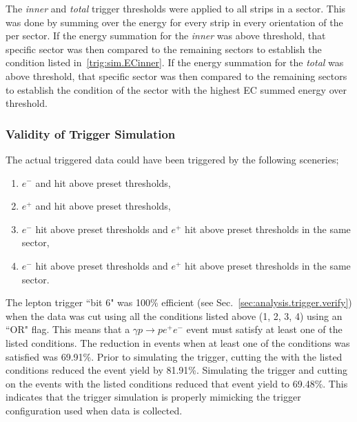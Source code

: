 The  \emph{inner} and  \emph{total} trigger thresholds were applied to all  strips in a sector. This was done by summing over the energy for every strip in every orientation of the  per sector. If the energy summation for the  \emph{inner} was above threshold,   that specific sector was then compared to the remaining sectors to establish the condition listed in~\ref{trig:sim.ECinner}. If the energy summation for the  \emph{total} was above threshold, that specific sector was then compared to the remaining sectors to establish the condition of the sector with the highest EC summed energy over threshold.
\subsubsection{Validity of Trigger Simulation}
The actual triggered data could have been triggered by the following sceneries;
\begin{enumerate}\label{trig:get.all}
	\item $e^-$  and  hit above preset thresholds,
	\item $e^+$  and  hit above preset thresholds,
	\item $e^-$  hit above preset thresholds and $e^+$  hit above preset thresholds in the same sector, 
	\item $e^-$  hit above preset thresholds and $e^+$  hit above preset thresholds in the same sector. 
\end{enumerate}
The lepton trigger ``bit 6" was 100\% efficient (see Sec.~\ref{sec:analysis.trigger.verify}) when the data was cut using all the conditions listed above (1, 2, 3, 4) using an ``OR" flag. This means that a $\gamma p \to p e^+ e^-$ event must satisfy at least one of the listed conditions. The reduction in events when at least one of the conditions was satisfied was 69.91\%. Prior to simulating the trigger, cutting the  with the listed conditions reduced the event yield by 81.91\%. Simulating the trigger and cutting on the  events with the listed conditions reduced that event yield to 69.48\%. This indicates that the trigger simulation is properly mimicking the trigger configuration used when data is collected. 

%
%
